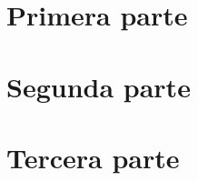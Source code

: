 



\hypersetup{pageanchor=false}
\frontmatter
	\myCover
	\setcounter{page}{0}
	
	
	

	\hypersetup{pageanchor=true}
	\tableofcontents

\mainmatter
	\part{Primera parte}
	
	
	
	
	\part{Segunda parte}
	
	
	
	
	\part{Tercera parte}
	

\backmatter
	
	\myBackCover

